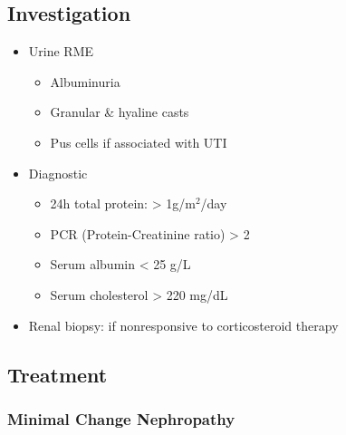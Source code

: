 \documentclass[
  12pt,
]{memoir}
\providecommand{\tightlist}{%
  \setlength{\itemsep}{0pt}\setlength{\parskip}{0pt}}
\begin{document}
\hypertarget{investigation-22}{%
\subsection{Investigation}\label{investigation-22}}

\begin{itemize}
\tightlist
\item
  Urine RME

  \begin{itemize}
  \tightlist
  \item
    Albuminuria
  \item
    Granular \& hyaline casts
  \item
    Pus cells if associated with UTI
  \end{itemize}
\item
  Diagnostic

  \begin{itemize}
  \tightlist
  \item
    24h total protein: \textgreater{} 1g/m\(^2\)/day
  \item
    PCR (Protein-Creatinine ratio) \textgreater{} 2
  \item
    Serum albumin \textless{} 25 g/L
  \item
    Serum cholesterol \textgreater{} 220 mg/dL
  \end{itemize}
\item
  Renal biopsy: if nonresponsive to corticosteroid therapy
\end{itemize}

\hypertarget{treatment-14}{%
\subsection{Treatment}\label{treatment-14}}

\hypertarget{minimal-change-nephropathy}{%
\subsubsection{Minimal Change
Nephropathy}\label{minimal-change-nephropathy}}
\end{document}
